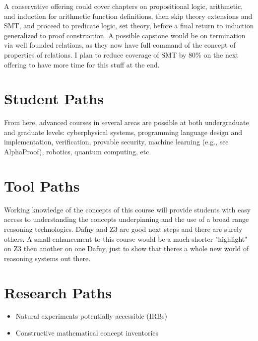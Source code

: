 \documentclass{book}
\providecommand{\tightlist}{%
  \setlength{\itemsep}{0pt}\setlength{\parskip}{0pt}}
\begin{document}
A conservative offering could cover chapters on propositional logic, arithmetic, and induction for arithmetic function definitions, then skip theory extensions and SMT, and proceed to predicate logic, set theory, before a final return to induction generalized to proof construction. A possible capstone would be on termination via well founded relations, as they now have full command of the concept of properties of relations. I plan to reduce coverage of SMT by 80\% on the next offering to have more time for this stuff at the end.

\hypertarget{pandoc.profile.debug__pandoc__debug__src__preface.md__student-paths}{%
\section*{Student Paths}\label{pandoc.profile.debug__pandoc__debug__src__preface.md__student-paths}}

From here, advanced courses in several areas are possible at both undergraduate and graduate
levels: cyberphysical systems, programming language design and implementation, verification,
provable security, machine learning (e.g., see AlphaProof), robotics, quantum computing, etc.

\hypertarget{pandoc.profile.debug__pandoc__debug__src__preface.md__tool-paths}{%
\section*{Tool Paths}\label{pandoc.profile.debug__pandoc__debug__src__preface.md__tool-paths}}

Working knowledge of the concepts of this course will provide students with easy access to
understanding the concepts underpinning and the use of a broad range reasoning technologies. Dafny and Z3 are good next steps and there are surely others. A small enhancement to this course would be a much shorter "highlight" on Z3 then another on one Dafny, just to show that there\textquotesingle s a whole new world of reasoning systems out there.

\hypertarget{pandoc.profile.debug__pandoc__debug__src__preface.md__research-paths}{%
\section*{Research Paths}\label{pandoc.profile.debug__pandoc__debug__src__preface.md__research-paths}}

\begin{itemize}
\tightlist
\item
  Natural experiments potentially accessible (IRBs)
\item
  Constructive mathematical concept inventories
\end{itemize}
\end{document}
